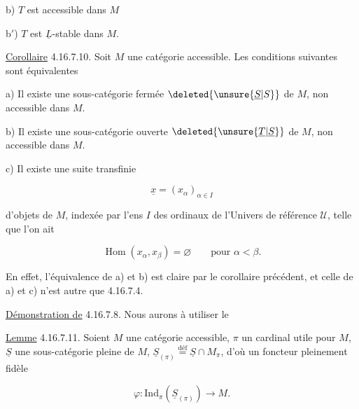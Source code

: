 

b) $T$ est accessible dans $M$

b$'$) $T$ est $\underline L$-stable dans $M$.

\uline{Corollaire} 4.16.7.10. Soit $M$ une catégorie accessible. Les conditions suivantes sont équivalentes

a) Il existe une sous-catégorie fermée $\deleted{\unsure{\underline S|S}}$ de $M$, non accessible dans $M$.

b) Il existe une sous-catégorie ouverte $\deleted{\unsure{\underline T|\underline S}}$ de $M$, non accessible dans $M$.


c) Il existe une suite transfinie 

\[\underline x=(x_\alpha)_{\alpha\in I}\]

d'objets de $M$, indexée par l'ens $I$ des ordinaux de l'Univers de référence $\mathcal U$, telle que l'on ait

\[\operatorname{Hom}(x_\alpha,x_\beta)=\varnothing\qquad\text{pour }\alpha<\beta .\]

En effet, l'équivalence de a) et b) est claire par le corollaire précédent,  et celle de a) et c) n'est autre que 4.16.7.4.

\uline{Démonstration de} 4.16.7.8. Nous aurons à utiliser le

\uline{Lemme} 4.16.7.11. Soient $M$ une catégorie accessible, $\pi$ un cardinal utile pour $M$, $\underline S$ une sous-catégorie pleine de $M$, $\underline S_{(\pi)}\overset{\mathrm{déf}}{=}\underline S\cap M_\pi$, d'où un foncteur pleinement fidèle

\[\varphi:\mathrm{Ind}_\pi(\underline S_{(\pi)})\longrightarrow M .\]

